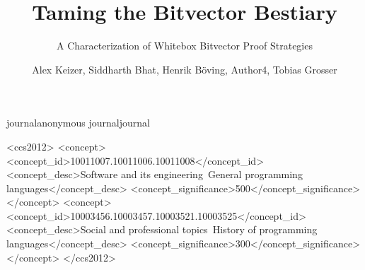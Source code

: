 \documentclass[review, acmsmall, review, screen]{acmart}
\def\acmversionanonymous{anonymous}
\def\acmversionjournal{journal}
\def\acmversion{anonymous}
\def\acmversion{journal}
\begin{document}
\title{Taming the Bitvector Bestiary}
\subtitle{A Characterization of Whitebox Bitvector Proof Strategies}

\author{Alex Keizer, Siddharth Bhat, Henrik B{\"o}ving, Author4, Tobias Grosser}

\begin{abstract}

\end{abstract}

\ifx\acmversion\acmversionanonymous
{} %
\renewcommand\footnotetextcopyrightpermission[1]{} %
\fi
\ifx\acmversion\acmversionjournal
\begin{CCSXML}
<ccs2012>
<concept>
<concept_id>10011007.10011006.10011008</concept_id>
<concept_desc>Software and its engineering~General programming languages</concept_desc>
<concept_significance>500</concept_significance>
</concept>
<concept>
<concept_id>10003456.10003457.10003521.10003525</concept_id>
<concept_desc>Social and professional topics~History of programming languages</concept_desc>
<concept_significance>300</concept_significance>
</concept>
</ccs2012>
\end{CCSXML}

\end{document}
